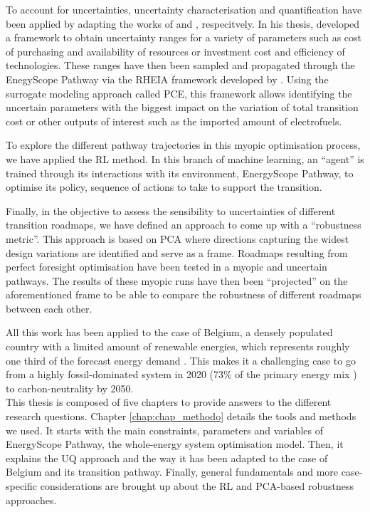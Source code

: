 To account for uncertainties, uncertainty characterisation and quantification have been applied by adapting the works of \citet{Moret2017PhDThesis} and \citet{coppittersthesis}, respecitvely. In his thesis, \citet{Moret2017PhDThesis} developed a framework to obtain uncertainty ranges for a variety of parameters such as cost of purchasing and availability of resources or investment cost and efficiency of technologies. These ranges have then been sampled and propagated through the EnegyScope Pathway via the RHEIA framework developed by \citet{coppittersthesis}. Using the surrogate modeling approach called \gls{PCE}, this framework allows identifying the uncertain parameters with the biggest impact on the variation of total transition cost or other outputs of interest such as the imported amount of electrofuels. 

To explore the different pathway trajectories in this myopic optimisation process, we have applied the \acrfull{RL} method. In this branch of machine learning, an ``agent'' is trained through its interactions with its environment, EnergyScope Pathway, to optimise its policy, \ie sequence of actions to take to support the transition. 

Finally, in the objective to assess the sensibility to uncertainties of different transition roadmaps, we have defined an approach to come up with a ``robustness metric''. This approach is based on \gls{PCA} where directions capturing the widest design variations are identified and serve as a frame. Roadmaps resulting from perfect foresight optimisation have been tested in a myopic and uncertain pathways. The results of these myopic runs have then been ``projected'' on the aforementioned frame to be able to compare the robustness of different roadmaps between each other.

All this work has been applied to the case of Belgium, a densely populated country with a limited amount of renewable energies, which represents roughly one third of the forecast energy demand \cite{Limpens2020}. This makes it a challenging case to go from a highly fossil-dominated system in 2020 (73\% of the primary energy mix \cite{spf_economy_2022}) to carbon-neutrality by 2050.\\

\noindent
This thesis is composed of five chapters to provide answers to the different research questions. Chapter \ref{chap:chap_methodo} details the tools and methods we used. It starts with the main constraints, parameters and variables of EnergyScope Pathway, the whole-energy system optimisation model. Then, it explains the \acrfull{UQ} approach and the way it has been adapted to the case of Belgium and its transition pathway. Finally, general fundamentals and more case-specific considerations are brought up about the \gls{RL} and \gls{PCA}-based robustness approaches.

